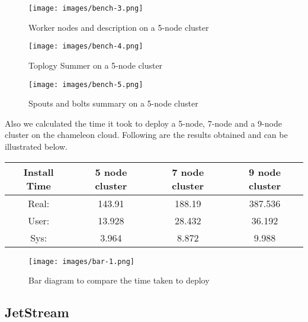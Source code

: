 \documentclass[9pt,twocolumn,twoside]{../../styles/osajnl}
\begin{document}
\begin{figure}[!htb]
  \texttt{[image: images/bench-3.png]}
  \caption{Worker nodes and description on a 5-node cluster }
  \label{Worker nodes and description on a 5-node cluster}
\end{figure}

\begin{figure}[!htb]
  \texttt{[image: images/bench-4.png]}
  \caption{Toplogy Summer on a 5-node cluster }
  \label{Topology summary on a 5-node cluster}
\end{figure}

\begin{figure}[!htb]
  \centering
  \texttt{[image: images/bench-5.png]}
  \caption{Spouts and bolts summary on a 5-node cluster }
  \label{Spouts and bolts summary on a 5-node cluster}
\end{figure}



Also we calculated the time it took to deploy a 5-node, 7-node and a 9-node cluster on the chameleon cloud. Following are the results obtained and can be illustrated below.

\begin{center}
 \begin{tabular}{|c|| c c c|} 
 \hline
 Install Time &  5 node cluster & 7 node cluster & 9 node cluster\\ [0.5ex]
 \hline\hline
 Real: & 143.91 & 188.19 & 387.536 \\ 
 \hline
 User: & 13.928 & 28.432 & 36.192 \\
 \hline
 Sys: & 3.964 & 8.872 & 9.988\\
 \hline
\end{tabular}
\end{center}



\begin{figure}[!htb]
  \texttt{[image: images/bar-1.png]}
  \caption{Bar diagram to compare the time taken to deploy }
  \label{Bar diagram to compare the time taken to deploy}
\end{figure}

\subsection{JetStream}
\end{document}

